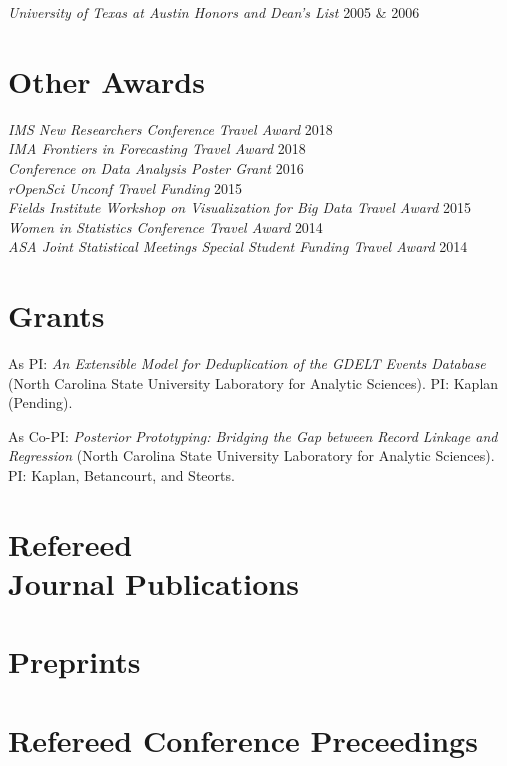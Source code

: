 \documentclass[margin,line]{res}
\begin{document}
\begin{resume}
{\em University of Texas at Austin Honors and Dean's List } \hfill 2005 \& 2006

\section{\sc Other Awards}
{\em IMS New Researchers Conference Travel Award} \hfill 2018\\
{\em IMA Frontiers in Forecasting Travel Award} \hfill 2018\\
{\em Conference on Data Analysis Poster Grant } \hfill 2016\\
{\em rOpenSci Unconf Travel Funding } \hfill 2015\\
{\em Fields Institute Workshop on Visualization for Big Data Travel Award } \hfill 2015\\
{\em Women in Statistics Conference Travel Award } \hfill 2014\\
{\em ASA Joint Statistical Meetings Special Student Funding Travel Award } \hfill 2014

\section{\sc Grants}
As PI: {\em An Extensible Model for Deduplication of the GDELT Events Database} (North Carolina State University Laboratory for Analytic Sciences). PI: Kaplan (Pending).

As Co-PI: {\em Posterior Prototyping: Bridging the Gap between Record Linkage and Regression} (North Carolina State University Laboratory for Analytic Sciences). PI: Kaplan, Betancourt, and Steorts.

\section{\sc Refereed \\ Journal Publications}
\printbibliography[keyword=refereed, heading=none, resetnumbers=true]

\section{\sc Preprints}
\printbibliography[keyword=submitted, heading=none, resetnumbers=false]

\printbibliography[keyword=inprep, heading=none]

\section{\sc Refereed Conference Preceedings}
\printbibliography[keyword=conf-ref, heading=none, resetnumbers=false]


\end{resume}
\end{document}
